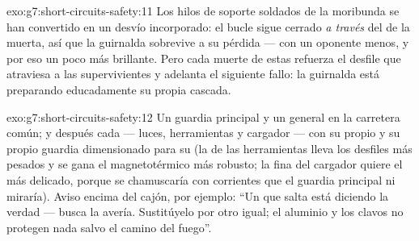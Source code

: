 \begin{solution}{exo:g7:short-circuits-safety:11}
Los hilos de soporte soldados de la  moribunda se han
convertido en un desvío incorporado: el bucle sigue cerrado
\emph{a través} del  de la  muerta, así que la
guirnalda sobrevive a su pérdida --- con un oponente menos, y por eso
un poco más brillante. Pero cada muerte de estas refuerza el desfile
que atraviesa a las supervivientes y adelanta el siguiente fallo: la
guirnalda está preparando educadamente su propia cascada.
\end{solution}

\begin{solution}{exo:g7:short-circuits-safety:12}
Un guardia principal y un  general en la carretera común; y
después cada  --- luces, herramientas y cargador --- con su
propio  y su propio guardia dimensionado para su
 (la  de las herramientas lleva los desfiles más
pesados y se gana el magnetotérmico más robusto; la  fina del
cargador quiere el  más delicado, porque se chamuscaría con
corrientes que el guardia principal ni miraría). Aviso encima del
cajón, por ejemplo: ``Un  que salta está diciendo la verdad
--- busca la avería. Sustitúyelo por otro igual; el aluminio y los
clavos no protegen nada salvo el camino del fuego''.
\end{solution}

